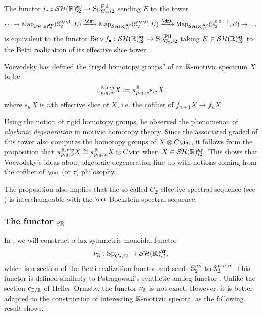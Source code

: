 \begin{prop}
  The functor $i_* : \SHRat \to \Sp_{C_2, i2}^{\Fil}$ sending $E$ to the tower
  \[ \dots \to \Map_{\SHRat} (\Ss_2 ^{0,0,1}, E) \xrightarrow{\ta} \Map_{\SHRat} (\Ss_2 ^{0,0,0}, E) \xrightarrow{\ta} \Map_{\SHRat} (\Ss_2 ^{0,0,-1}, E) \to \dots \]
  is equivalent to the functor $\b \circ f_\bullet : \SHRat \to \Sp_{C_2, i2}^{\Fil}$ taking $E \in \SHRat$ to the Betti realization of its effective slice tower.
\end{prop}

\begin{rec}
  Voevodsky has defined the ``rigid homotopy groups'' \cite[Definition 5.1]{VoeOpenProbs} of an $\mathbb{R}$-motivic spectrum $X$ to be
  \[\pi_{p,q,w} ^{\mathbb{R},rig} X \coloneqq \pi_{p,q,w} ^{\mathbb{R}} s_w X,\]
  where $s_w X$ is $n$th effective slice of $X$, i.e. the cofiber of $f_{n+1} X \to f_n X$.
\end{rec}

Using the notion of rigid homotopy groups, he observed the phenomenon of \emph{algebraic degeneration} in motivic homotopy theory.
Since the associated graded of this tower also computes the homotopy groups of $X \otimes C\ta$, it follows from the proposition that $\pi_{p,q,w} ^{\R,rig} X \cong \pi_{p,q,w} ^{\R} X \otimes C\ta$ when $X \in \SHRat$.
This shows that Voevodsky's ideas about algebraic degeneration line up with notions coming from the cofiber of $\ta$ (or $\tau$) philosophy.

The proposition also implies that the so-called $C_2$-effective spectral sequence (see \cite{Kong}) is interchangeable with the $\ta$-Bockstein spectral sequence.


\subsubsection{The functor $\nu_{\mathbb{R}}$}
%
%
In , we will construct a lax symmetric monoidal functor
\[\nur : \Sp_{C_2, i2} \to \SHRat,\]
which is a section of the Betti realization functor and sends $\operatorname{\mathbb{S}}_2^{n\rho}$ to $\operatorname{\mathbb{S}}_2^{n,n,n}$.
This functor is defined similarly to Pstragowski's synthetic analog functor \cite[Definition 4.3]{Pstragowski}.
Unlike the section $c_{\mathbb{C}/\mathbb{R}}$ of Heller--Ormsby, the functor $\nu_{\mathbb{R}}$ is not exact.
However, it is better adapted to the construction of interesting $\mathbb{R}$-motivic spectra, as the following result shows.

